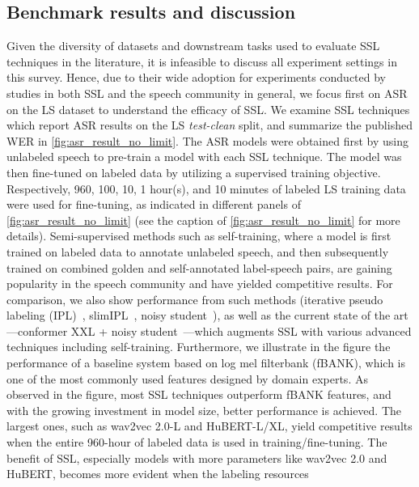 \subsection{Benchmark results and discussion} \label{sec:benchmark} 
Given the diversity of datasets and downstream tasks used to evaluate SSL
techniques in the literature, it is infeasible to discuss all 
experiment settings in this survey. Hence, due to their wide adoption for
experiments conducted by studies in both SSL and the speech community in
general, we focus first on ASR on the LS dataset to understand the
efficacy of SSL. We examine SSL techniques which report ASR results on the LS
\textit{test-clean} split, and summarize the published WER in
\cref{fig:asr_result_no_limit}. The ASR models were obtained first by using
unlabeled speech to pre-train a model with each SSL technique. The model was
then fine-tuned on labeled data by utilizing a supervised training objective.
Respectively, 960, 100, 10, 1 hour(s), and 10 minutes of labeled LS training data
were used for fine-tuning, as indicated in different panels of
\cref{fig:asr_result_no_limit} (see
the caption of \cref{fig:asr_result_no_limit} for more details).
Semi-supervised methods such as self-training, where a model is first trained
on labeled data to annotate unlabeled speech, and then subsequently trained on
combined golden and self-annotated label-speech pairs, are gaining popularity
in the speech community and have yielded competitive results. For comparison, we also
show performance from such methods (iterative pseudo labeling 
(IPL)~\cite{xu2020iterative}, slimIPL~\cite{likhomanenko2020slimipl}, noisy 
student~\cite{park2020improved}), as well as the current state of the art---conformer XXL + noisy
student~\cite{zhang2020pushing}---which augments SSL with various advanced
techniques including self-training. Furthermore, we illustrate in the figure
the performance of a baseline system \cite{yang21c_interspeech} based on log mel filterbank (fBANK), which is one of the most commonly used features designed by domain experts.
As observed in the figure, most SSL techniques outperform fBANK
features, and with the growing investment in model size, better performance is
achieved. The largest ones, such as wav2vec 2.0-L and HuBERT-L/XL, yield
  competitive results                         %
when the entire 960-hour of labeled data is used in
training/fine-tuning. The benefit of SSL, especially models with more parameters
like wav2vec 2.0 and HuBERT, becomes more evident when the labeling resources
